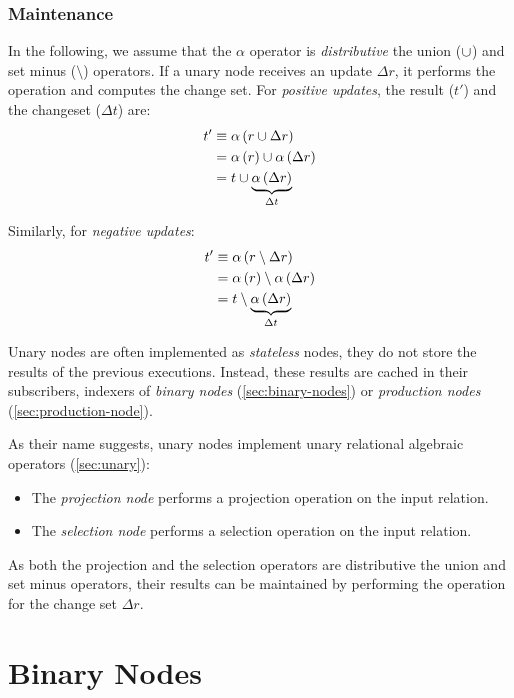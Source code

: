 \subsubsection{Maintenance}

In the following, we assume that the $\alpha$ operator is \emph{distributive} \wrt the union ($\cup$) and set minus ($\setminus$) operators. If a unary node receives an update $\Delta r$, it performs the operation and computes the change set. For \emph{positive updates}, the result ($t'$) and the changeset ($\Delta t$) are:
\begin{align*}
	t'       & \equiv \mathrm{\alpha}\left(r \cup \Delta r\right) \\
			 & = \mathrm{\alpha}\left(r\right) \cup \mathrm{\alpha}\left(\Delta r\right) \\
			 & = t \cup \underbrace{\mathrm{\alpha}\left(\Delta r\right)}_{\Delta t} \\
\end{align*}

Similarly, for \emph{negative updates}:
\begin{align*}
	t'       & \equiv \mathrm{\alpha}\left(r \setminus \Delta r\right) \\
			 & = \mathrm{\alpha}\left(r\right) \setminus \mathrm{\alpha}\left(\Delta r\right) \\
			 & = t \setminus \underbrace{\mathrm{\alpha}\left(\Delta r\right)}_{\Delta t}
\end{align*}

Unary nodes are often implemented as \emph{stateless} nodes, \ie they do not store the results of the previous executions. Instead, these results are cached in their subscribers, \eg indexers of \emph{binary nodes} (\autoref{sec:binary-nodes}) or \emph{production nodes} (\autoref{sec:production-node}).

As their name suggests, unary nodes implement unary relational algebraic operators (\autoref{sec:unary}):

\begin{itemize}
	\item The \emph{projection node} performs a projection operation on the input relation.
	\item The \emph{selection node} performs a selection operation on the input relation.
\end{itemize}

As both the projection and the selection operators are distributive \wrt the union and set minus operators, their results can be maintained by performing the operation for the change set $\Delta r$.

\section{Binary Nodes}
\label{sec:binary-nodes}

